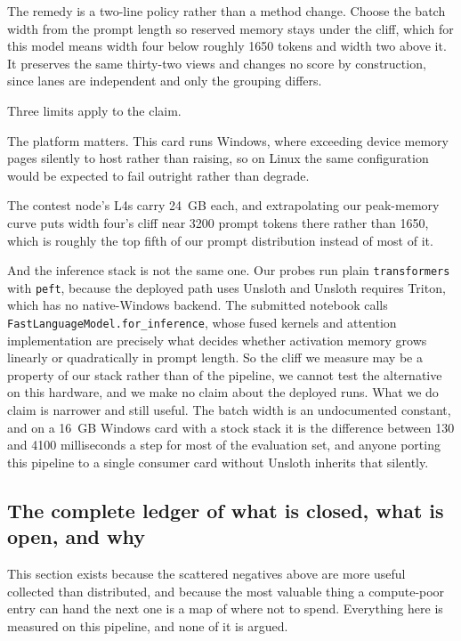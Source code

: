 \documentclass[11pt]{article}
\begin{document}
The remedy is a two-line policy rather than a method change. Choose the batch width from the prompt
length so reserved memory stays under the cliff, which for this model means width four below roughly
1650 tokens and width two above it. It preserves the same thirty-two views and changes no score by
construction, since lanes are independent and only the grouping differs.

Three limits apply to the claim.

The platform matters. This card runs Windows, where exceeding device memory pages silently to host
rather than raising, so on Linux the same configuration would be expected to fail outright rather
than degrade.

The contest node's L4s carry 24~GB each, and extrapolating our peak-memory curve puts width four's
cliff near 3200 prompt tokens there rather than 1650, which is roughly the top fifth of our prompt
distribution instead of most of it.

And the inference stack is not the same one. Our probes run plain \texttt{transformers} with
\texttt{peft}, because the deployed path uses Unsloth and Unsloth requires Triton, which has no
native-Windows backend. The submitted notebook calls \texttt{FastLanguageModel.for\_inference},
whose fused kernels and attention implementation are precisely what decides whether activation memory
grows linearly or quadratically in prompt length. So the cliff we measure may be a property of our
stack rather than of the pipeline, we cannot test the alternative on this hardware, and we make no
claim about the deployed runs. What we do claim is narrower and still useful. The batch width is an
undocumented constant, and on a 16~GB Windows card with a stock stack it is the difference between 130
and 4100 milliseconds a step for most of the evaluation set, and anyone porting this pipeline to a
single consumer card without Unsloth inherits that silently.

\subsection{The complete ledger of what is closed, what is open, and why}
\label{sec:ledger}
This section exists because the scattered negatives above are more useful collected than distributed,
and because the most valuable thing a compute-poor entry can hand the next one is a map of where not
to spend. Everything here is measured on this pipeline, and none of it is argued.
\end{document}
